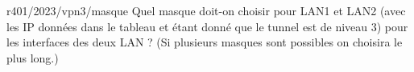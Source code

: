 \begin{question}{r401/2023/vpn3/masque}
  Quel masque doit-on choisir pour LAN1 et LAN2 (avec les IP données
  dans le tableau et étant donné que le tunnel est de niveau 3) pour
  les interfaces des deux LAN ? (Si plusieurs masques sont possibles
  on choisira le plus long.)
  \begin{reponseshoriz}
  \end{reponseshoriz}
\end{question}
